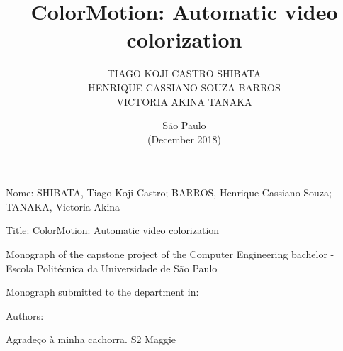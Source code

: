 \documentclass[12pt,openright,oneside,a4paper,english]{abntex2}
\author{TIAGO KOJI CASTRO SHIBATA\\
    HENRIQUE CASSIANO SOUZA BARROS\\
    VICTORIA AKINA TANAKA}
\title{ColorMotion: Automatic video colorization}
\date{São Paulo\\(December 2018)}
\begin{document}
    \begin{otherlanguage}{english}

    \imprimircapa
    \imprimirfalsafolhaderosto
    \imprimirfolhaderosto

    \begin{folhadeaprovacao}
    \noindent
    Nome: SHIBATA, Tiago Koji Castro; BARROS, Henrique Cassiano Souza; TANAKA, Victoria Akina

    \noindent
    Title: ColorMotion: Automatic video colorization

    \vspace{1cm}
    \hspace{.2\textwidth} %
    \begin{minipage}{.75\textwidth}
        \begin{sloppypar}
            Monograph of the capstone project of the Computer Engineering bachelor - Escola Politécnica da Universidade de São Paulo \\[0.3cm]
        \end{sloppypar}
    \end{minipage}

    \noindent
    Monograph submitted to the department in: \\

    \begin{center}
    Authors:
    \end{center}

    \hspace{5cm}
    \hspace{5cm}
    \hspace{5cm}

    \end{folhadeaprovacao}

    \begin{agradecimentos}
    Agradeço à minha cachorra. S2 Maggie

    \end{agradecimentos}

    \begin{epigrafe}
    \begin{flushright}
    \vspace*{\fill}


\end{flushright}
\end{epigrafe}
\end{otherlanguage}
\end{document}

